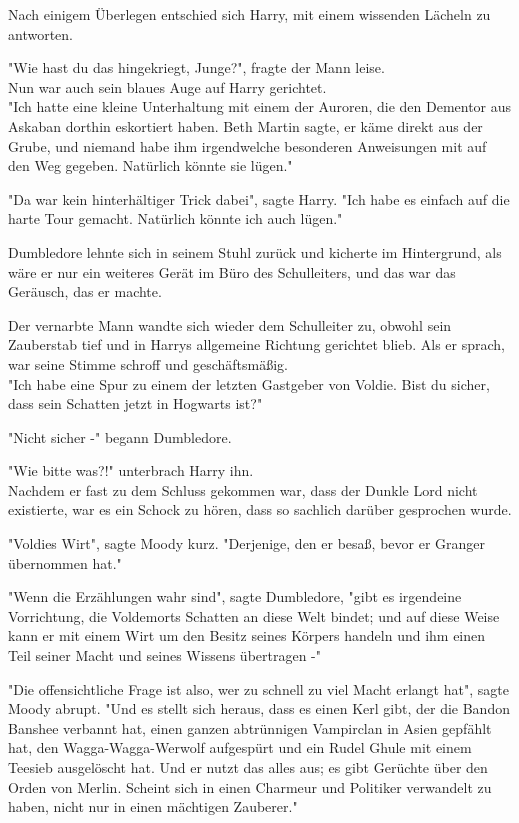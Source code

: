 {Nach einigem Überlegen entschied sich Harry, mit einem wissenden Lächeln zu antworten.

"Wie hast du das hingekriegt, Junge?", fragte der Mann leise.\\ Nun war auch sein blaues Auge auf Harry gerichtet.\\ "Ich hatte eine kleine Unterhaltung mit einem der Auroren, die den Dementor aus Askaban dorthin eskortiert haben. Beth Martin sagte, er käme direkt aus der Grube, und niemand habe ihm irgendwelche besonderen Anweisungen mit auf den Weg gegeben. Natürlich könnte sie lügen."

"Da war kein hinterhältiger Trick dabei", sagte Harry. "Ich habe es einfach auf die harte Tour gemacht. Natürlich könnte ich auch lügen."

Dumbledore lehnte sich in seinem Stuhl zurück und kicherte im Hintergrund, als wäre er nur ein weiteres Gerät im Büro des Schulleiters, und das war das Geräusch, das er machte.

Der vernarbte Mann wandte sich wieder dem Schulleiter zu, obwohl sein Zauberstab tief und in Harrys allgemeine Richtung gerichtet blieb. Als er sprach, war seine Stimme schroff und geschäftsmäßig.\\ "Ich habe eine Spur zu einem der letzten Gastgeber von Voldie. Bist du sicher, dass sein Schatten jetzt in Hogwarts ist?"

"Nicht sicher -" begann Dumbledore.

"Wie bitte was?!" unterbrach Harry ihn.\\ Nachdem er fast zu dem Schluss gekommen war, dass der Dunkle Lord nicht existierte, war es ein Schock zu hören, dass so sachlich darüber gesprochen wurde.

"Voldies Wirt", sagte Moody kurz. "Derjenige, den er besaß, bevor er Granger übernommen hat."

"Wenn die Erzählungen wahr sind", sagte Dumbledore, "gibt es irgendeine Vorrichtung, die Voldemorts Schatten an diese Welt bindet; und auf diese Weise kann er mit einem Wirt um den Besitz seines Körpers handeln und ihm einen Teil seiner Macht und seines Wissens übertragen -"

"Die offensichtliche Frage ist also, wer zu schnell zu viel Macht erlangt hat", sagte Moody abrupt. "Und es stellt sich heraus, dass es einen Kerl gibt, der die Bandon Banshee verbannt hat, einen ganzen abtrünnigen Vampirclan in Asien gepfählt hat, den Wagga-Wagga-Werwolf aufgespürt und ein Rudel Ghule mit einem Teesieb ausgelöscht hat. Und er nutzt das alles aus; es gibt Gerüchte über den Orden von Merlin. Scheint sich in einen Charmeur und Politiker verwandelt zu haben, nicht nur in einen mächtigen Zauberer."

}
